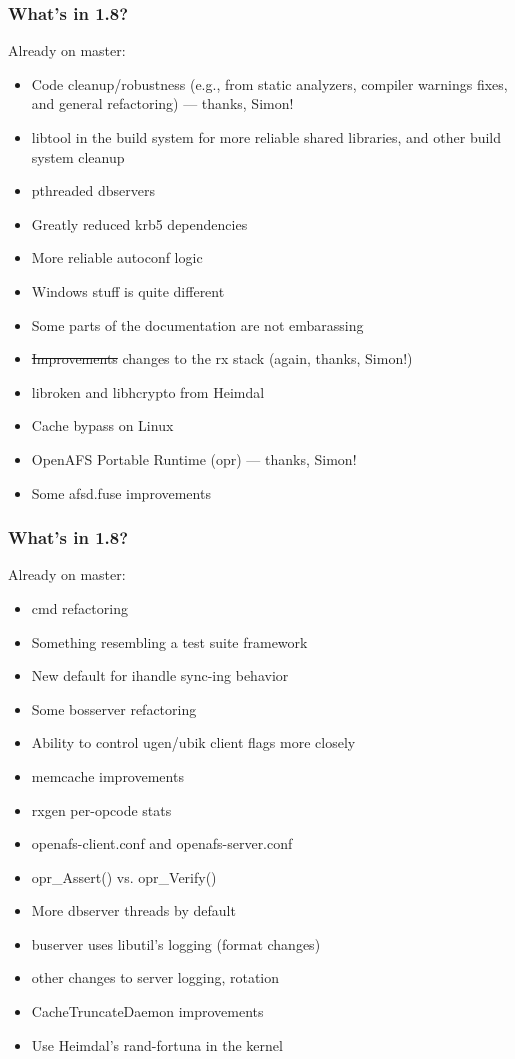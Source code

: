 \documentclass{beamer}
\begin{document}
\begin{frame}
\frametitle{What's in 1.8?}
Already on master:
\begin{itemize}
\item{Code cleanup/robustness (e.g., from static analyzers, compiler
warnings fixes, and general refactoring) --- thanks, Simon!}
\item{libtool in the build system for more reliable shared libraries,
and other build system cleanup}
\item{pthreaded dbservers}
\item{Greatly reduced krb5 dependencies}
\item{More reliable autoconf logic}
\item{Windows stuff is quite different}
\item{Some parts of the documentation are not embarassing}
\item{\sout{Improvements} changes to the rx stack (again, thanks, Simon!)}
\item{libroken and libhcrypto from Heimdal}
\item{Cache bypass on Linux}
\item{OpenAFS Portable Runtime (opr) --- thanks, Simon!}
\item{Some afsd.fuse improvements}
\end{itemize}
\end{frame}
\begin{frame}
\frametitle{What's in 1.8?}
Already on master:
\begin{itemize}
\item{cmd refactoring}
\item{Something resembling a test suite framework}
\item{New default for ihandle sync-ing behavior}
\item{Some bosserver refactoring}
\item{Ability to control ugen/ubik client flags more closely}
\item{memcache improvements}
\item{rxgen per-opcode stats}
\item{openafs-client.conf and openafs-server.conf}
\item{opr\_Assert() vs. opr\_Verify()}
\item{More dbserver threads by default}
\item{buserver uses libutil's logging (format changes)}
\item{other changes to server logging, rotation}
\item{CacheTruncateDaemon improvements}
\item{Use Heimdal's rand-fortuna in the kernel}
\end{itemize}
\end{frame}
\end{document}
